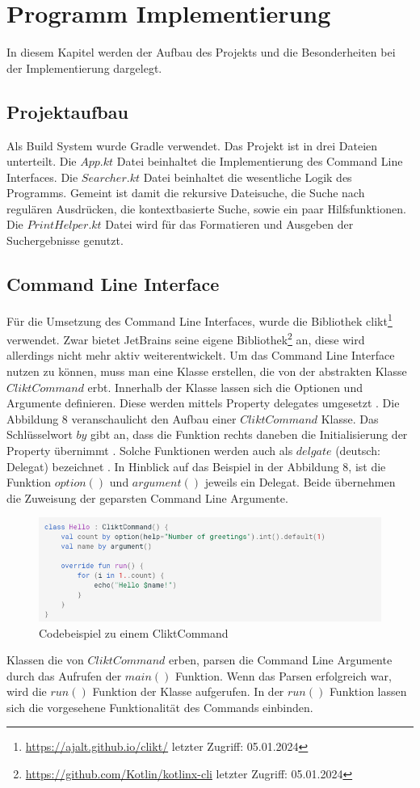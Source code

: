 \documentclass{article}
\begin{document}
\section{Programm Implementierung}
In diesem Kapitel werden der Aufbau des Projekts und die Besonderheiten bei der Implementierung dargelegt.
\subsection{Projektaufbau}
Als Build System wurde Gradle verwendet. Das Projekt ist in drei Dateien unterteilt. Die $App.kt$ Datei beinhaltet die Implementierung des Command Line Interfaces. Die $Searcher.kt$ Datei beinhaltet die wesentliche Logik des Programms. Gemeint ist damit die rekursive Dateisuche, die Suche nach regulären Ausdrücken, die kontextbasierte Suche, sowie ein paar Hilfsfunktionen. Die $PrintHelper.kt$ Datei wird für das Formatieren und Ausgeben der Suchergebnisse genutzt.
\subsection{Command Line Interface}
Für die Umsetzung des Command Line Interfaces, wurde die Bibliothek clikt\footnote{\url{https://ajalt.github.io/clikt/} letzter Zugriff: 05.01.2024} verwendet. Zwar bietet JetBrains seine eigene Bibliothek\footnote{\url{https://github.com/Kotlin/kotlinx-cli} letzter Zugriff: 05.01.2024} an, diese wird allerdings nicht mehr aktiv weiterentwickelt. Um das Command Line Interface nutzen zu können, muss man eine Klasse erstellen, die von der abstrakten Klasse $CliktCommand$ erbt. Innerhalb der Klasse lassen sich die Optionen und Argumente definieren. Diese werden mittels Property delegates umgesetzt \cite{clikt}. Die Abbildung 8 veranschaulicht den Aufbau einer $CliktCommand$ Klasse. Das Schlüsselwort $by$ gibt an, dass die Funktion rechts daneben die Initialisierung der Property übernimmt \cite{KotlinLangDoc}. Solche Funktionen werden auch als $delgate$ (deutsch: Delegat) bezeichnet \cite{KotlinLangDoc}.
\newline In Hinblick auf das Beispiel in der Abbildung 8, ist die Funktion $option()$ und $argument()$ jeweils ein Delegat. Beide übernehmen die Zuweisung der geparsten Command Line Argumente.
\begin{figure}[!htb]
    \centering
    \includegraphics[width=\linewidth]{img/CliktCommand.png}
    \caption{Codebeispiel zu einem CliktCommand\footnotemark}
\end{figure}
Klassen die von $CliktCommand$ erben, parsen die Command Line Argumente durch das Aufrufen der $main()$ Funktion. Wenn das Parsen erfolgreich war, wird die $run()$ Funktion der Klasse aufgerufen. In der $run()$ Funktion lassen sich die vorgesehene Funktionalität des Commands einbinden.
\end{document}

